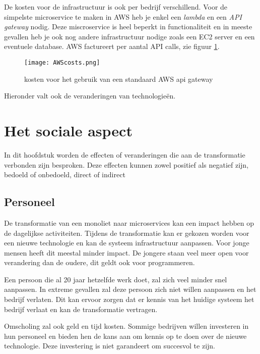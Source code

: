 De kosten voor de infrastructuur is ook per bedrijf verschillend. Voor de simpelste microservice te maken in AWS heb je enkel een \emph{lambda} en een \emph{API gateway} nodig. Deze miscroservice is heel beperkt in functionaliteit en in meeste gevallen heb je ook nog andere infrastructuur nodige zoals een EC2 server en een eventuele database. AWS factureert per aantal API calls, zie figuur \ref{awscost}.

\begin{figure}[!htb]
     \centering
    \texttt{[image: AWScosts.png]}    
    \caption{kosten voor het gebruik van een standaard AWS api gateway \label{awscost}}
\end{figure}

Hieronder valt ook de veranderingen van technologieën.

\section{Het sociale aspect}

In dit hoofdstuk worden de effecten of veranderingen die aan de transformatie verbonden zijn besproken. Deze effecten kunnen zowel positief als negatief zijn, bedoeld of onbedoeld, direct of indirect \autocite{Clusters2020}

\subsection{Personeel}

De transformatie van een monoliet naar microservices kan een impact hebben op de dagelijkse activiteiten. Tijdens de transformatie kan er gekozen worden voor een nieuwe technologie en kan de systeem infrastructuur aanpassen. Voor jonge mensen heeft dit meestal minder impact. De jongere staan veel meer open voor verandering dan de oudere, dit geldt ook voor programmeren.

Een persoon die al 20 jaar hetzelfde werk doet, zal zich veel minder snel aanpassen. In extreme gevallen zal deze persoon zich niet willen aanpassen en het bedrijf verlaten. Dit kan ervoor zorgen dat er kennis van het huidige systeem het bedrijf verlaat en kan de transformatie vertragen. 

Omscholing zal ook geld en tijd kosten. Sommige bedrijven willen investeren in hun personeel en bieden hen de kans aan om kennis op te doen over de nieuwe technologie. Deze investering is niet garandeert om succesvol te zijn.


